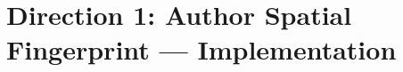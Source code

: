 \documentclass[logo,msc]{infthesis}
\begin{document}
\section{Direction 1: Author Spatial Fingerprint — Implementation}
%
%
%
\end{document}
